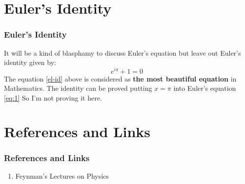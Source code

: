 \documentclass{beamer}
\begin{document}
\section{Euler's Identity}
\begin{frame}
    \frametitle{Euler's Identity}
    It will be a kind of blasphamy to discuss Euler's equation but leave out Euler's identity given by:
    \begin{equation}
        \label{el-id}
        e^{i\pi} + 1 = 0
    \end{equation}
The equation \ref{el-id} above is considered as \textbf{the most beautiful equation} in Mathematics. The identity can be proved putting $x=\pi$ into Euler's equation \ref{eq:1} So I'm not proving it here.
\end{frame}

\section{References and Links}
\begin{frame}
    \frametitle{References and Links}
    \begin{enumerate}
        \item Feynman's Lectures on Physics
    \end{enumerate}
\end{frame}
\end{document}
